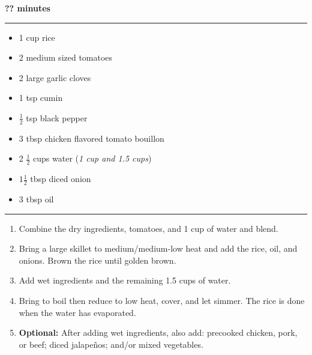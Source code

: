  \hfill {\large \textbf{?? minutes}}

\vspace{15pt} \hrule \vspace{15pt}
\begin{itemize}
	\item 1 cup rice
	\item 2 medium sized tomatoes
	\item 2 large garlic cloves
	\item 1 tsp cumin
	\item $\frac{1}{2}$ tsp black pepper
	\item 3 tbsp chicken flavored tomato bouillon
	\item 2 $\frac{1}{2}$ cups water (\textit{1 cup and 1.5 cups})
	\item $1\frac{1}{2}$ tbsp diced onion
	\item 3 tbsp oil
\end{itemize}

\vspace{15pt} \hrule \vspace{15pt}
\begin{enumerate}
	\item Combine the dry ingredients, tomatoes, and 1 cup of water and blend.
	\item Bring a large skillet to medium/medium-low heat and add the rice, oil, and onions. Brown the rice until golden brown.
	\item Add wet ingredients and the remaining 1.5 cups of water.
	\item Bring to boil then reduce to low heat, cover, and let simmer. The rice is done when the water has evaporated.
	\item \textbf{Optional:} After adding wet ingredients, also add: precooked chicken, pork, or beef; diced jalapeños; and/or mixed vegetables.
\end{enumerate}

